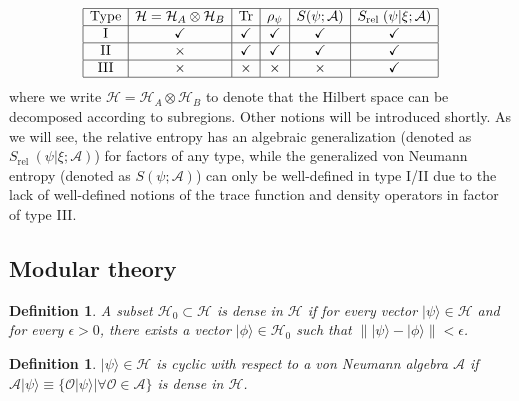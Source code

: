 \documentclass[a4paper,11pt]{article}
\newtheorem{defn}[thm]{Definition}
\newcommand{\ket}[1]{| #1 \rangle } %
\renewcommand{\=}[1]{\stackrel{#1}{=}} %
\def\A{\mathcal{A}}
\def\O{\mathcal{O}}
\def\H{\mathcal{H}}
\def\Tr{\text{Tr}}
\begin{document}
$$
\begin{array}{|c|c|c|c|c|c|}
	\hline {\text {Type}} & \H=\H_A \otimes \H_B & \Tr & \rho_\psi & S(\psi;\A)  & S_{\text {rel }}(\psi|\xi;\A) \\
	\hline \text { I } & \checkmark & \checkmark & \checkmark & \checkmark  & \checkmark \\
	\hline \text { II } & \times & \checkmark & \checkmark & \checkmark &  \checkmark \\
	\hline \text { III } & \times & \times & \times & \times  & \checkmark \\
	\hline
\end{array}
$$
where we write $\H=\H_A \otimes \H_B$ to denote that the Hilbert space can be decomposed according to subregions. Other notions will be introduced shortly. As we will see, the relative entropy has an algebraic generalization (denoted as $S_{\text {rel }}(\psi|\xi;\A)$) for factors of any type, while the generalized von Neumann entropy (denoted as $S(\psi;\A)$) can only be well-defined in type I/II due to the lack of well-defined notions of the trace function and density operators in factor of type III.


%	
%	
















\subsection{Modular theory}


\begin{defn}
	A subset $\mathcal{H}_{0}\subset\mathcal{H}$ is dense in $\mathcal{H}$ if for every vector $\ket{\psi} \in \mathcal{H}$ and for every $\epsilon>0$, there exists a vector $\ket{\phi} \in \mathcal{H}_{0}$ such that $\|\ket{\psi}-\ket{\phi}\|<\epsilon$.
\end{defn}

\begin{defn}
	$\ket{\psi}\in\H$ is cyclic with respect to a von Neumann algebra $\A$ if $\A\ket{\psi}\equiv\{\O\ket{\psi}|\forall \O\in \A\}$ is dense in $\H$.
\end{defn}
\end{document}
